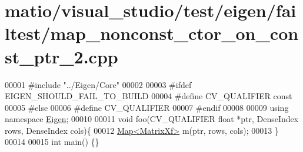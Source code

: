 \hypertarget{matio_2visual__studio_2test_2eigen_2failtest_2map__nonconst__ctor__on__const__ptr__2_8cpp_source}{}\section{matio/visual\+\_\+studio/test/eigen/failtest/map\+\_\+nonconst\+\_\+ctor\+\_\+on\+\_\+const\+\_\+ptr\+\_\+2.cpp}
\label{matio_2visual__studio_2test_2eigen_2failtest_2map__nonconst__ctor__on__const__ptr__2_8cpp_source}

\begin{DoxyCode}
00001 \textcolor{preprocessor}{#include "../Eigen/Core"}
00002 
00003 \textcolor{preprocessor}{#ifdef EIGEN\_SHOULD\_FAIL\_TO\_BUILD}
00004 \textcolor{preprocessor}{#define CV\_QUALIFIER const}
00005 \textcolor{preprocessor}{#else}
00006 \textcolor{preprocessor}{#define CV\_QUALIFIER}
00007 \textcolor{preprocessor}{#endif}
00008 
00009 \textcolor{keyword}{using namespace }\hyperlink{namespace_eigen}{Eigen};
00010 
00011 \textcolor{keywordtype}{void} foo(CV\_QUALIFIER \textcolor{keywordtype}{float} *ptr, DenseIndex rows, DenseIndex cols)\{
00012     \hyperlink{group___core___module_class_eigen_1_1_map}{Map<MatrixXf>} m(ptr, rows, cols);
00013 \}
00014 
00015 \textcolor{keywordtype}{int} main() \{\}
\end{DoxyCode}
